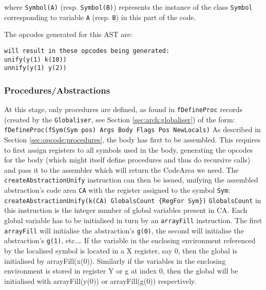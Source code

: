 \documentclass[a4paper]{memoir}
\begin{document}
where \lstinline!Symbol(A)! (resp. \lstinline!Symbol(B)!) represents the instance of the class \lstinline!Symbol! corresponding to variable \lstinline!A! (resp. \lstinline!B!) in this part of the code. 

The opcodes generated for this AST are:

\begin{lstlisting}
will result in these opcodes being generated:
unify(y(1) k(10))
unnify(y(1) y(2))
\end{lstlisting}


\subsubsection{Procedures/Abstractions}\label{sec:codegen:procedures}
At this stage, only procedures are defined, as found in \lstinline!fDefineProc! records (created by the \lstinline!Globaliser!, see Section \ref{sec:arch:globaliser}) of the form:
\lstinline!fDefineProc(fSym(Sym pos) Args Body Flags Pos NewLocals)!
As described in Section \ref{sec:opcode:procedures}, the body has first to be assembled. This requires to first assign registers to all symbols used in the body, generating the opcodes for the body (which might itself define procedures and thus do recursive calls) and pass it to the assembler which will return the CodeArea we need.
The \lstinline!createAbstractionUnify! instruction can then be issued, unifying the assembled abstraction's code area \lstinline!CA! with the register assigned to the symbol \lstinline!Sym!:
\lstinline!createAbstractionUnify(k(CA) GlobalsCount {RegFor Sym})!
\lstinline!GlobalsCount! in this instruction is the integer number of global variables present in CA. Each global variable has to be initialised in turn by an \lstinline!arrayFill! instruction. The first \lstinline!arrayFill! will initialise the abstraction's \lstinline!g(0)!, the second will initialise the abstraction's \lstinline!g(1)!, etc.\ldots
If the variable in the enclosing environment referenced by the localised symbol is located in a X register, say 0, then the global is initialised by arrayFill(x(0)). Similarly if the variables in the enclosing environment is stored in register Y or g at index 0, then the global will be initialised with arrayFill(y(0)) or arrayFill(g(0)) respectively.
\end{document}

